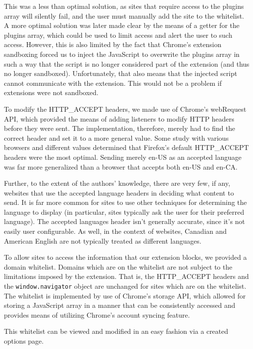 \documentclass[12pt,a4paper]{article}
\begin{document}
This was a less than optimal solution, as sites that require access to the plugins array will silently fail, and the user must manually add the site to the whitelist. A more optimal solution was later made clear by the means of a getter for the plugins array, which could be used to limit access and alert the user to such access. However, this is also limited by the fact that Chrome's extension sandboxing forced us to inject the JavaScript to overwrite the plugins array in such a way that the script is no longer considered part of the extension (and thus no longer sandboxed). Unfortunately, that also means that the injected script cannot communicate with the extension. This would not be a problem if extensions were not sandboxed.

To modify the HTTP\_ACCEPT headers, we made use of Chrome's webRequest API\cite{webrequest}, which provided the means of adding listeners to modify HTTP headers before they were sent. The implementation, therefore, merely had to find the correct header and set it to a more general value. Some study with various browsers and different values determined that Firefox's default HTTP\_ACCEPT headers were the most optimal. Sending merely en-US as an accepted language was far more generalized than a browser that accepts both en-US and en-CA.

Further, to the extent of the authors' knowledge, there are very few, if any, websites that use the accepted language headers in deciding what content to send. It is far more common for sites to use other techniques for determining the language to display (in particular, sites typically ask the user for their preferred language). The accepted languages header isn't generally accurate, since it's not easily user configurable. As well, in the context of websites, Canadian and American English are not typically treated as different languages.

To allow sites to access the information that our extension blocks, we provided a domain whitelist. Domains which are on the whitelist are not subject to the limitations imposed by the extension. That is, the HTTP\_ACCEPT headers and the \texttt{window.navigator} object are unchanged for sites which are on the whitelist. The whitelist is implemented by use of Chrome's storage API\cite{storage}, which allowed for storing a JavaScript array in a manner that can be consistently accessed and provides means of utilizing Chrome's account syncing feature.

This whitelist can be viewed and modified in an easy fashion via a created options page.
\end{document}
